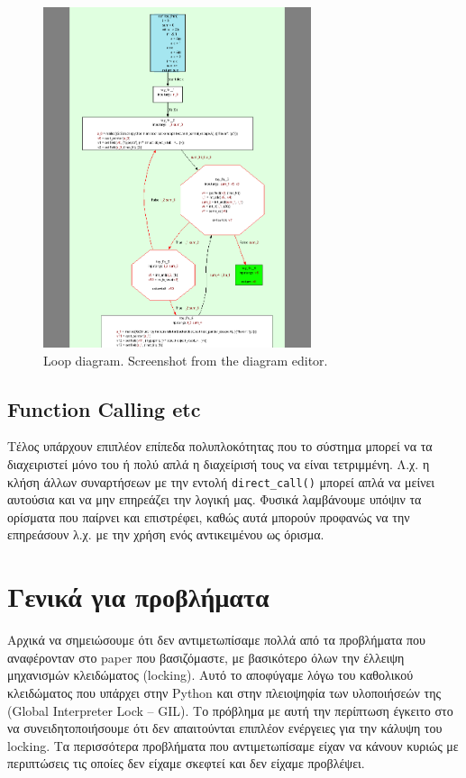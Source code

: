 \begin{figure}[h]
\centering
\includegraphics[width=0.7\textwidth]{loop-func.png}
\caption{Loop diagram. Screenshot from the diagram editor.}
\label{figure-5}
\end{figure}

\subsection{Function Calling etc}

Τέλος υπάρχουν επιπλέον επίπεδα πολυπλοκότητας που το σύστημα μπορεί να τα
διαχειριστεί μόνο του ή πολύ απλά η διαχείρισή τους να είναι τετριμμένη. Λ.χ. η
κλήση άλλων συναρτήσεων με την εντολή \texttt{direct\_call()} μπορεί απλά να
μείνει αυτούσια και να μην επηρεάζει την λογική μας. Φυσικά λαμβάνουμε υπόψιν τα
ορίσματα που παίρνει και επιστρέφει, καθώς αυτά μπορούν προφανώς να την
επηρεάσουν λ.χ. με την χρήση ενός αντικειμένου ως όρισμα.


\section{Γενικά για προβλήματα}

Αρχικά να σημειώσουμε ότι δεν αντιμετωπίσαμε πολλά από τα προβλήματα που
αναφέρονταν στο paper\cite{stadler2014partial} που βασιζόμαστε, με βασικότερο
όλων την έλλειψη μηχανισμών κλειδώματος (locking). Αυτό το αποφύγαμε λόγω του
καθολικού κλειδώματος που υπάρχει στην Python και στην πλειοψηφία των
υλοποιήσεών της (Global Interpreter Lock – GIL). Το πρόβλημα με αυτή την
περίπτωση έγκειτο στο να συνειδητοποιήσουμε ότι δεν απαιτούνται επιπλέον
ενέργειες για την κάλυψη του locking.\cite{gil} Τα περισσότερα προβλήματα που
αντιμετωπίσαμε είχαν να κάνουν κυριώς με περιπτώσεις τις οποίες δεν είχαμε
σκεφτεί και δεν είχαμε προβλέψει.

